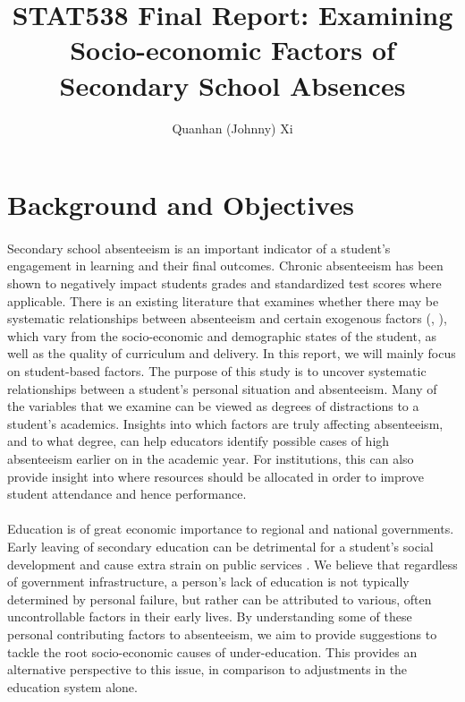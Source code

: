 \documentclass[12pt, titlepage]{article}
\author{Quanhan (Johnny) Xi}
\title{STAT538 Final Report: Examining Socio-economic Factors of Secondary School Absences}
\begin{document}
	\maketitle
	\section{Background and Objectives}
	\paragraph{} Secondary school absenteeism is an important indicator of a student's engagement in learning and their final outcomes. Chronic absenteeism has been shown to negatively impact students grades and standardized test scores where applicable. There is an existing literature that examines whether there may be systematic relationships between absenteeism and certain exogenous factors (\cite{Currie::2009}, \cite{Gubbels::2019}), which vary from the socio-economic and demographic states of the student, as well as the quality of curriculum and delivery. In this report, we will mainly focus on student-based factors. The purpose of this study is to uncover systematic relationships between a student's personal situation and absenteeism. Many of the variables that we examine can be viewed as degrees of distractions to a student's academics. Insights into which factors are truly affecting absenteeism, and to what degree, can help educators identify possible cases of high absenteeism earlier on in the academic year. For institutions, this can also provide insight into where resources should be allocated in order to improve student attendance and hence performance. 
	
	\paragraph{} Education is of great economic importance to regional and national governments. Early leaving of secondary education can be detrimental for a student's social development and cause extra strain on public services \cite{Rocque::2016}. We believe that regardless of government infrastructure, a person's lack of education is not typically determined by personal failure, but rather can be attributed to various, often uncontrollable factors in their early lives. By understanding some of these personal contributing factors to absenteeism, we aim to provide suggestions to tackle the root socio-economic causes of under-education. This provides an alternative perspective to this issue, in comparison to adjustments in the education system alone. 
	
\end{document}
